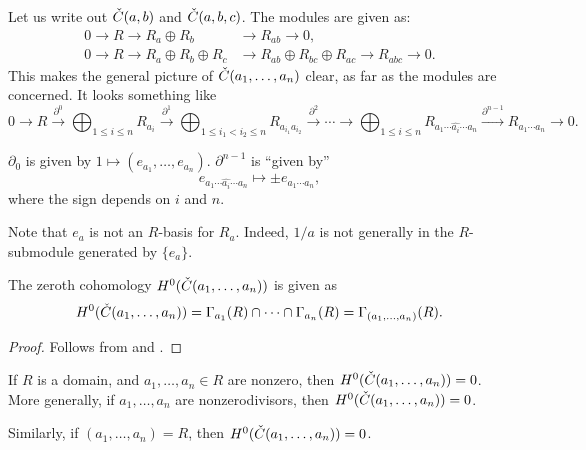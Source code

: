 \begin{ex}
	Let us write out $\check{C}(a, b)$ and $\check{C}(a, b, c)$. The modules are given as:
	\begin{align*} 
		0 \to R \to R_{a} \oplus R_{b} &\to R_{ab} \to 0, \\
		0 \to R \to R_{a} \oplus R_{b} \oplus R_{c} &\to R_{ab} \oplus R_{bc} \oplus R_{ac} \to R_{abc} \to 0.
	\end{align*}
	This makes the general picture of $\check{C}(a_{1}, \ldots, a_{n})$ clear, as far as the modules are concerned. It looks something like
	\begin{equation} \label{eq:cech}
		0 \to R \xrightarrow{\partial^{0}} \bigoplus_{1 \le i \le n} R_{a_{i}} \xrightarrow{\partial^{1}} \bigoplus_{1 \le i_{1} < i_{2} \le n} R_{a_{i_{1}} a_{i_{2}}} \xrightarrow{\partial^{2}} \cdots \to \bigoplus_{1 \le i \le n} R_{a_{1} \cdots \widehat{a_{i}} \cdots a_{n}} \xrightarrow{\partial^{n - 1}} R_{a_{1} \cdots a_{n}} \to 0.
	\end{equation}

	$\partial_{0}$ is given by $1 \mapsto (e_{a_{1}}, \ldots, e_{a_{n}})$. $\partial^{n - 1}$ is ``given by''
	\begin{equation*} 
		e_{a_{1} \cdots \widehat{a_{i}} \cdots a_{n}} \mapsto \pm e_{a_{1} \cdots a_{n}},
	\end{equation*}
	where the sign depends on $i$ and $n$.
\end{ex}

\begin{rem}
	Note that $e_{a}$ is not an $R$-basis for $R_{a}$. Indeed, $1/a$ is not generally in the $R$-submodule generated by $\{e_{a}\}$.
\end{rem}

\begin{prop}
	The zeroth cohomology $H^{0}(\check{C}(a_{1}, \ldots, a_{n}))$ is given as 
	\begin{equation*} 
		H^{0}(\check{C}(a_{1}, \ldots, a_{n})) = \Gamma_{a_{1}}(R) \cap \cdots \cap \Gamma_{a_{n}}(R) = \Gamma_{(a_{1}, \ldots, a_{n})}(R).
	\end{equation*}
\end{prop}
\begin{proof} 
	Follows from  and . 
\end{proof}

\begin{cor}
	If $R$ is a domain, and $a_{1}, \ldots, a_{n} \in R$ are nonzero, then $H^{0}(\check{C}(a_{1}, \ldots, a_{n})) = 0$. More generally, if $a_{1}, \ldots, a_{n}$ are nonzerodivisors, then $H^{0}(\check{C}(a_{1}, \ldots, a_{n})) = 0$. 

	Similarly, if $(a_{1}, \ldots, a_{n}) = R$, then $H^{0}(\check{C}(a_{1}, \ldots, a_{n})) = 0$.
\end{cor}


